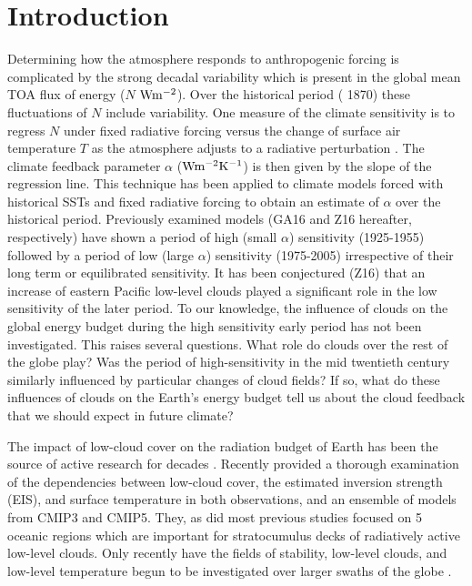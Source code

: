 \section{Introduction}
Determining how the atmosphere responds to anthropogenic forcing is complicated by the strong decadal variability which is present in the global mean TOA flux of energy ($N$  $\rm{W m^{-2}}$).  Over the historical period ( 1870) these fluctuations of $N$ include  variability.   One measure of the climate sensitivity is to regress $N$ under fixed radiative forcing versus the change of surface air temperature $T$ as the atmosphere adjusts to a radiative perturbation \citep{Gregory_etal_2004}.  The climate feedback parameter $\alpha$ ($\rm{W m^{-2} K^{-1}}$) is then given by the slope of the regression line.   This technique has been applied to climate models forced with historical SSTs and fixed radiative forcing to obtain an estimate of $\alpha$ over the historical period.   Previously examined models \citep{Gregory_Andrews_2016, Zhou_etal_2016}  (GA16 and Z16 hereafter, respectively) have shown a period of high (small $\alpha$) sensitivity (1925-1955) followed by a period of low (large $\alpha$) sensitivity (1975-2005) irrespective of their long term or equilibrated sensitivity.  It has been conjectured (Z16) that an increase of eastern Pacific low-level clouds played a significant role in the low sensitivity of the later period.  To our knowledge, the influence of clouds on the global energy budget during the high sensitivity early period has not been investigated.  This raises several questions.  What role do clouds over the rest of the globe play?  Was the period of high-sensitivity in the mid twentieth century similarly influenced by particular changes of cloud fields?  If so, what do these influences of clouds on the Earth's energy budget tell us about the cloud feedback that we should expect in  future climate?

The impact of low-cloud cover on the radiation budget of Earth has been the source of active research for decades \citep[e.g.,][] {Randall_etal_1984, Klein_Hartmann_1993,Bony_etal_2004, Bony_Dufresne_2005}.   Recently \citet{Qu_etal_2014,Qu_etal_2015} provided a thorough examination of the dependencies between low-cloud cover, the estimated inversion strength (EIS), and surface temperature in both observations, and an ensemble of models from CMIP3 and CMIP5.  They, as did most previous studies \citep [e.g.,][]{Klein_Hartmann_1993,Wood_Bretherton_2006} focused on 5 oceanic regions which are important for stratocumulus decks of radiatively active low-level clouds.  Only recently have the fields of stability, low-level clouds, and low-level temperature begun to be investigated over larger swaths of the globe  \citep {Webb_etal_2015, Rose_Rayborn_2016, Grise_Medeiros_2016, Zhou_etal_2016}.  

